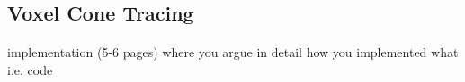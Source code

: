 \newpage
\subsection{Voxel Cone Tracing}\paragraph{}

implementation (5-6 pages) where you argue in detail how you implemented what i.e. code